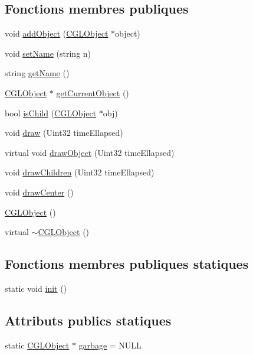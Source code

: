 \subsection*{Fonctions membres publiques}
\begin{DoxyCompactItemize}
\item 
void \hyperlink{class_c_g_l_object_a83b8918905a5449c94e4447791b61abd}{add\-Object} (\hyperlink{class_c_g_l_object}{C\-G\-L\-Object} $\ast$object)
\item 
void \hyperlink{class_c_g_l_object_aacbe6a176989b2cef7bc2be472d5c512}{set\-Name} (string n)
\item 
string \hyperlink{class_c_g_l_object_a98fea12fb2a998e0e13087c24fc9122a}{get\-Name} ()
\item 
\hyperlink{class_c_g_l_object}{C\-G\-L\-Object} $\ast$ \hyperlink{class_c_g_l_object_a17159bf8a16301adca577be4311806d1}{get\-Current\-Object} ()
\item 
bool \hyperlink{class_c_g_l_object_a80d01439776edc9443b47a7a9e5b9e94}{is\-Child} (\hyperlink{class_c_g_l_object}{C\-G\-L\-Object} $\ast$obj)
\item 
void \hyperlink{class_c_g_l_object_a39c4cde56d18140384842d074407c5c4}{draw} (Uint32 time\-Ellapsed)
\item 
virtual void \hyperlink{class_c_g_l_object_a2781ec98c37bd209f2382c5130a365b9}{draw\-Object} (Uint32 time\-Ellapsed)
\item 
void \hyperlink{class_c_g_l_object_a6c23675f91b2adc88a95d6da869652d4}{draw\-Children} (Uint32 time\-Ellapsed)
\item 
void \hyperlink{class_c_g_l_object_a310a26c3464c16c7b08349fe41123364}{draw\-Center} ()
\item 
\hyperlink{class_c_g_l_object_add00987cd4a5ee06cc4436766392434b}{C\-G\-L\-Object} ()
\item 
virtual \hyperlink{class_c_g_l_object_aa92f9815a1cc5d563b991a5ed786bd5e}{$\sim$\-C\-G\-L\-Object} ()
\end{DoxyCompactItemize}
\subsection*{Fonctions membres publiques statiques}
\begin{DoxyCompactItemize}
\item 
static void \hyperlink{class_c_g_l_object_aa08cbbe873bf264dbb34f233bd21844b}{init} ()
\end{DoxyCompactItemize}
\subsection*{Attributs publics statiques}
\begin{DoxyCompactItemize}
\item 
static \hyperlink{class_c_g_l_object}{C\-G\-L\-Object} $\ast$ \hyperlink{class_c_g_l_object_aa042ffd6be6c676dd6fa779c2e23752d}{garbage} = N\-U\-L\-L
\end{DoxyCompactItemize}

